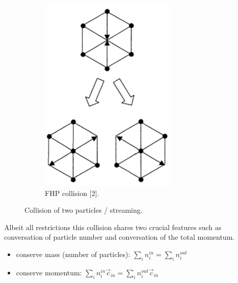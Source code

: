 \begin{figure}[H]
\begin{subfigure}[h]{0.3\textwidth}
    \includegraphics[width=\textwidth]{img/fig5.png}
    \caption{FHP collision [2].}
  \end{subfigure}
  \caption{Collision of two particles / streaming.}
\end{figure}

Albeit all restrictions this collision shares two crucial features such as conversation of particle number and conversation of the total momentum.

\begin{itemize}
\item conserve mass (number of particles): $ \sum_i n_i^{in} = \sum_i n_i^{out} $
\item conserve momentum: $ \sum_i n_i^{in} \vec{c}_{ia} = \sum_i n_i^{out} \vec{c}_{ia} $
\end{itemize}

